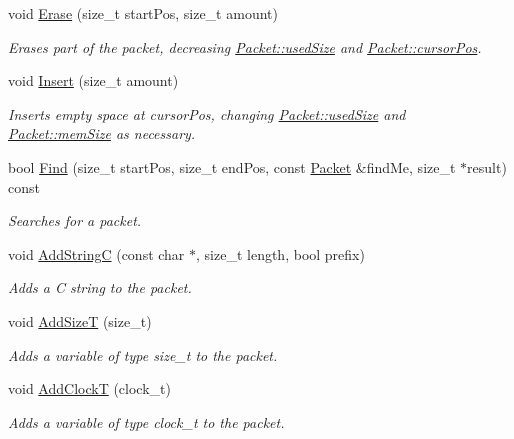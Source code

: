 \begin{DoxyCompactItemize}
void \hyperlink{class_packet_a58b00ec8ee88525187c8a095572530a9}{Erase} (size\_\-t startPos, size\_\-t amount)
\begin{DoxyCompactList}\small\item\em Erases part of the packet, decreasing \hyperlink{class_packet_a1da1eb4f461522942bada139f0d94acd}{Packet::usedSize} and \hyperlink{class_packet_acce561b50a43897e8fd0c03222b617bd}{Packet::cursorPos}. \item\end{DoxyCompactList}\item 
void \hyperlink{class_packet_a7eba2a1d780f6723d98452c425f636c6}{Insert} (size\_\-t amount)
\begin{DoxyCompactList}\small\item\em Inserts empty space at cursorPos, changing \hyperlink{class_packet_a1da1eb4f461522942bada139f0d94acd}{Packet::usedSize} and \hyperlink{class_packet_a1c2e5054d27221467e8db5dc9e71c04a}{Packet::memSize} as necessary. \item\end{DoxyCompactList}\item 
bool \hyperlink{class_packet_aa095be7beee502a044b0d0fb2954713e}{Find} (size\_\-t startPos, size\_\-t endPos, const \hyperlink{class_packet}{Packet} \&findMe, size\_\-t $\ast$result) const 
\begin{DoxyCompactList}\small\item\em Searches for a packet. \item\end{DoxyCompactList}\item 
void \hyperlink{class_packet_a5a9857fa7701741a9be369c56c97ab53}{AddStringC} (const char $\ast$, size\_\-t length, bool prefix)
\begin{DoxyCompactList}\small\item\em Adds a C string to the packet. \item\end{DoxyCompactList}\item 
void \hyperlink{class_packet_a35b1fc5b107629dfc63dd0d9382cfb03}{AddSizeT} (size\_\-t)
\begin{DoxyCompactList}\small\item\em Adds a variable of type size\_\-t to the packet. \item\end{DoxyCompactList}\item 
void \hyperlink{class_packet_a60b85220c73a9474bfe17cb0e5d00771}{AddClockT} (clock\_\-t)
\begin{DoxyCompactList}\small\item\em Adds a variable of type clock\_\-t to the packet. \item\end{DoxyCompactList}\item 

\end{DoxyCompactItemize}
